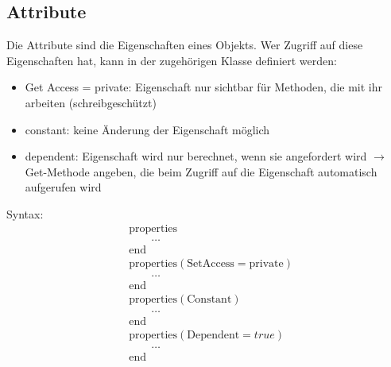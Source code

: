 \documentclass[12pt,bibstyle=none,pagenumberinfooter]{ifmdocument}
\begin{document}
	\subsection{Attribute}
	Die Attribute sind die Eigenschaften eines Objekts. Wer Zugriff auf diese Eigenschaften hat, kann in der zugehörigen Klasse definiert werden:
	\begin{itemize}
		\item Get Access = private: Eigenschaft nur sichtbar f\"ur Methoden, die mit ihr arbeiten (schreibgesch\"utzt)
		\item constant: keine \"Anderung der Eigenschaft m\"oglich
		\item dependent: Eigenschaft wird nur berechnet, wenn sie angefordert wird $\rightarrow$ Get-Methode angeben, die beim Zugriff auf die Eigenschaft automatisch aufgerufen wird
	\end{itemize}
Syntax:
	\begin{align*}
		&\text{properties} \\
		& \qquad \ldots \\
		&\text{end} \\
		&\text{properties} (\text{SetAccess}=\text{private}) \\
		& \qquad \ldots \\               
		&\text{end} \\
		&\text{properties} (\text{Constant})\\
		& \qquad\ldots \\
		&\text{end}\\
		&\text{properties} (\text{Dependent} = true)\\
		& \qquad \ldots \\
		&\text{end} 
	\end{align*}
\end{document}
